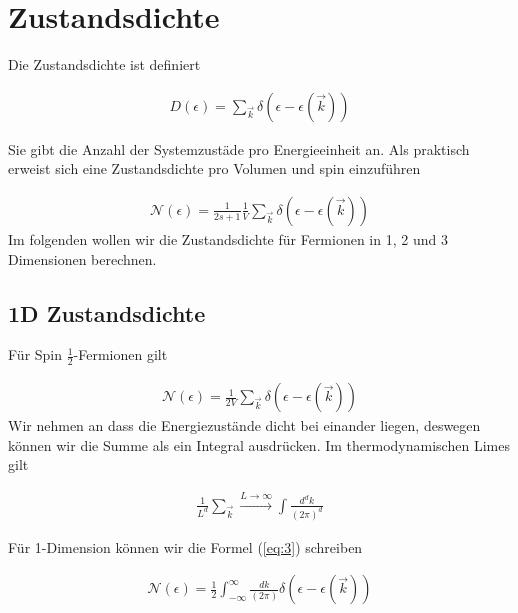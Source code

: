 
\usepackage{amsmath} 





\section*{Zustandsdichte}

Die Zustandsdichte ist definiert 

\begin{align}
  \label{eq:1}
  \boxed{ D(\epsilon) = \sum_{\vec k} \delta(\epsilon - \epsilon(\vec k)) }
\end{align}

Sie gibt die Anzahl der Systemzustäde pro Energieeinheit an. Als praktisch erweist sich eine Zustandsdichte pro Volumen und spin einzuführen

\begin{align}
  \label{eq:2}
  \mathcal N(\epsilon) = \frac{1}{2s+1}\frac{1}{V} \sum_{\vec k} \delta(\epsilon - \epsilon(\vec k))
\end{align}
Im folgenden wollen wir die Zustandsdichte für Fermionen in 1, 2 und 3 Dimensionen berechnen.

\subsection*{1D Zustandsdichte}

Für Spin \(\frac{1}{2}\)-Fermionen gilt

\begin{align}
  \label{eq:3}
  \mathcal N(\epsilon) = \frac{1}{2V} \sum_{\vec k} \delta(\epsilon - \epsilon(\vec k))
\end{align}
Wir nehmen an dass die Energiezustände dicht bei einander liegen, deswegen können wir die Summe als ein Integral ausdrücken. Im thermodynamischen Limes gilt

\begin{align}
  \label{eq:4}
\boxed{  \frac{1}{L^d}\sum_{\vec k} \xrightarrow{L\to \infty} \int \frac{d^d k}{(2\pi)^d} }
\end{align}

Für 1-Dimension können wir die Formel (\ref{eq:3}) schreiben

\begin{align}
  \label{eq:5}
  \mathcal N(\epsilon) = \frac{1}{2}  \int_{-\infty}^{\infty} \frac{d k}{(2\pi)} \delta(\epsilon - \epsilon(\vec k))
\end{align}


